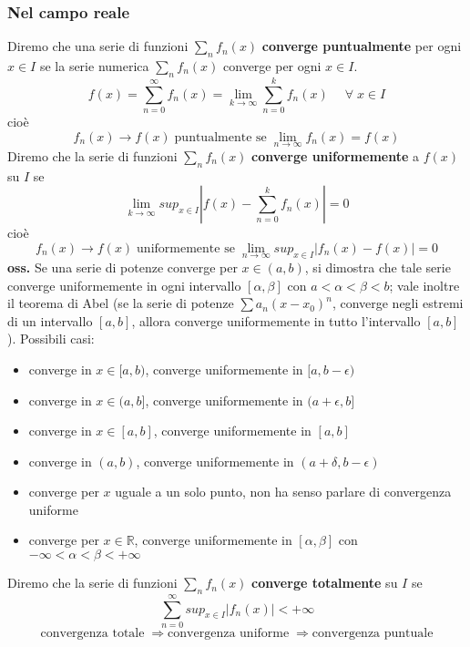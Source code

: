 \subsubsection{Nel campo reale}
Diremo che una serie di funzioni $\sum_{n}f_n(x)$ \textbf{converge puntualmente} per ogni $x \in I$ se la serie numerica $\sum_{n}f_n(x)$ converge per ogni $x \in I$.
\[
    f(x) = \sum_{n=0}^{\infty} f_n(x) = \lim_{k\rightarrow \infty} \sum_{n=0}^{k} f_n(x) \quad \;\forall\;x \in I
\]
cioè
\[
    f_n(x) \rightarrow f(x) \; \text{puntualmente se}\; \lim_{n\rightarrow \infty} f_n(x) = f(x) 
\]
\newline
Diremo che la serie di funzioni $\sum_{n}f_n(x)$ \textbf{converge uniformemente} a $f(x)$ su $I$ se
\[
    \lim_{k\rightarrow \infty} sup_{x \in I}\left| f(x) - \sum_{n=0}^{k}f_n(x) \right| = 0
\]
cioè
\[
    f_n(x) \rightarrow f(x) \; \text{uniformemente se}\; \lim_{n\rightarrow \infty} sup_{x \in I}\left| f_n(x) - f(x) \right| = 0
\]
\textbf{oss.} Se una serie di potenze converge per $x \in (a,b)$, si dimostra che tale serie converge uniformemente in ogni intervallo $[\alpha, \beta]$ con $a < \alpha< \beta < b$; vale inoltre il teorema di Abel (se la serie di potenze $\sum a_n (x-x_0)^n$, converge negli estremi di un intervallo $[a,b]$, allora converge uniformemente in tutto l'intervallo $[a,b]$). Possibili casi:
\begin{itemize}
    \item converge in $x \in[a,b)$, converge uniformemente in $[a, b-\epsilon)$
    \item converge in $x \in(a,b]$, converge uniformemente in $(a + \epsilon, b]$
    \item converge in $x \in[a,b]$, converge uniformemente in $[a, b]$
    \item converge in $(a,b)$, converge uniformemente in $(a + \delta, b-\epsilon)$
    \item converge per $x$ uguale a un solo punto, non ha senso parlare di convergenza uniforme
    \item converge per $x \in\mathbb{R}$, converge uniformemente in $[\alpha, \beta]$ con $-\infty < \alpha < \beta < + \infty$
\end{itemize}
Diremo che la serie di funzioni $\sum_{n}f_n(x)$ \textbf{converge totalmente} su $I$ se
\[
    \sum_{n=0}^{\infty} sup_{x \in I}\left| f_n(x) \right| < + \infty
\]
\newline
\[
    \text{convergenza totale}\; \Longrightarrow \text{convergenza uniforme}\; \Longrightarrow \text{convergenza puntuale}
\]
\newline
